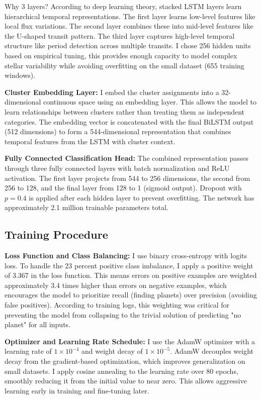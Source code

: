 \documentclass[letterpaper]{article}
\begin{document}
Why 3 layers? According to deep learning theory, stacked LSTM layers learn hierarchical temporal representations. The first layer learns low-level features like local flux variations. The second layer combines these into mid-level features like the U-shaped transit pattern. The third layer captures high-level temporal structure like period detection across multiple transits. I chose 256 hidden units based on empirical tuning, this provides enough capacity to model complex stellar variability while avoiding overfitting on the small dataset (655 training windows).

\textbf{Cluster Embedding Layer:} I embed the cluster assignments into a 32-dimensional continuous space using an embedding layer. This allows the model to learn relationships between clusters rather than treating them as independent categories. The embedding vector is concatenated with the final BiLSTM output (512 dimensions) to form a 544-dimensional representation that combines temporal features from the LSTM with cluster context.

\textbf{Fully Connected Classification Head:} The combined representation passes through three fully connected layers with batch normalization and ReLU activation. The first layer projects from 544 to 256 dimensions, the second from 256 to 128, and the final layer from 128 to 1 (sigmoid output). Dropout with $p=0.4$ is applied after each hidden layer to prevent overfitting. The network has approximately 2.1 million trainable parameters total.

\subsection{Training Procedure}

\textbf{Loss Function and Class Balancing:} I use binary cross-entropy with logits loss. To handle the 23 percent positive class imbalance, I apply a positive weight of 3.367 in the loss function. This means errors on positive examples are weighted approximately 3.4 times higher than errors on negative examples, which encourages the model to prioritize recall (finding planets) over precision (avoiding false positives). According to training logs, this weighting was critical for preventing the model from collapsing to the trivial solution of predicting "no planet" for all inputs.

\textbf{Optimizer and Learning Rate Schedule:} I use the AdamW optimizer with a learning rate of $1 \times 10^{-4}$ and weight decay of $1 \times 10^{-5}$. AdamW decouples weight decay from the gradient-based optimization, which improves generalization on small datasets. I apply cosine annealing to the learning rate over 80 epochs, smoothly reducing it from the initial value to near zero. This allows aggressive learning early in training and fine-tuning later.
\end{document}

